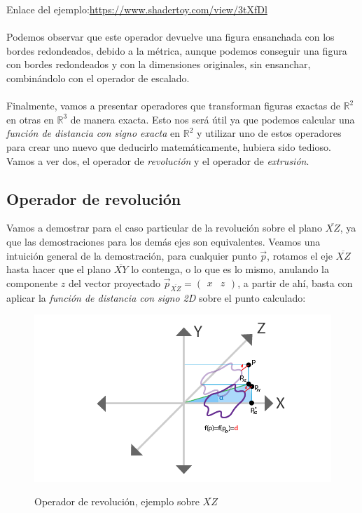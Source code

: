 Enlace del ejemplo:\url{https://www.shadertoy.com/view/3tXfDl}\\\\
Podemos observar que este operador devuelve una figura ensanchada con los bordes redondeados, debido a la métrica, aunque podemos conseguir una figura con bordes redondeados y con la dimensiones originales, sin ensanchar, combinándolo con el operador de escalado.\\\\
Finalmente, vamos a presentar operadores que transforman figuras exactas de \(\mathbb{R}^2\) en otras en \(\mathbb{R}^3\) de manera exacta. Esto nos será útil ya que podemos calcular una \textit{función de distancia con signo exacta} en \(\mathbb{R}^2\) y utilizar uno de estos operadores para crear uno nuevo que deducirlo matemáticamente, hubiera sido tedioso. Vamos a ver dos, el operador de \textit{revolución} y el operador de \textit{extrusión}.

\subsection{Operador de revolución}
Vamos a demostrar para el caso particular de la revolución sobre el plano \(\overline{XZ}\), ya que las demostraciones para los demás ejes son equivalentes. Veamos una intuición general de la demostración, para cualquier punto \(\Vec{p}\), rotamos el eje \(\overline{XZ}\) hasta hacer que el plano \(\overline{XY}\) lo contenga, o lo que es lo mismo, anulando la componente \(z\) del vector proyectado  \(\Vec{p}_{\overline{XZ}}=\begin{pmatrix}
    x& z
\end{pmatrix}\), a partir de ahí, basta con aplicar la \textit{función de distancia con signo 2D} sobre el punto calculado:

\begin{figure}[H]
  \centering
  \captionsetup{justification=centering}%
  \includegraphics[width=1.0\textwidth]{secciones/imagenes/sdf/proofs/proof_revolution.png}\label{fig:capsula}
  \caption{Operador de revolución, ejemplo sobre \(\overline{XZ}\)}
\end{figure}

